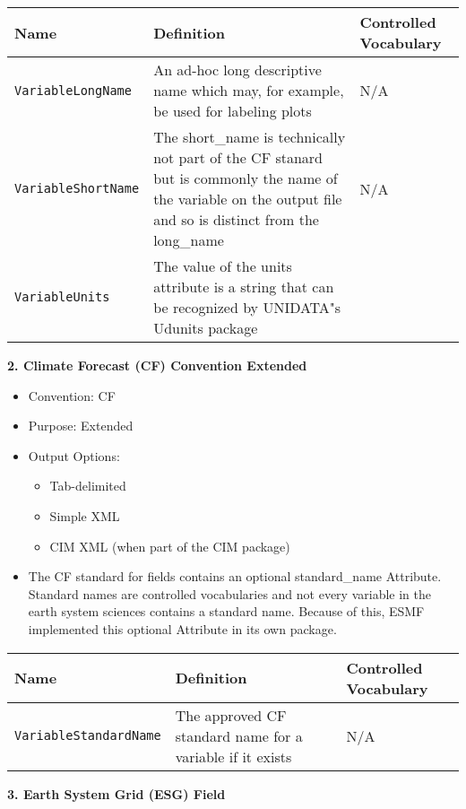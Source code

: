 \begin{tabular}{|p{8cm}|p{20cm}|p{10cm}|}
    {\bf Name } & {\bf Definition} & {\bf Controlled Vocabulary} \\
    \hline\hline
    {\tt VariableLongName} & An ad-hoc long descriptive name which may, for example, be used for labeling plots & N/A\\
    {\tt VariableShortName}  & The short\_name is technically not part of the CF stanard but is commonly the name of the variable on the output file and so is distinct from the long\_name & N/A \\
    {\tt VariableUnits}  & The value of the units attribute is a string that can be recognized by UNIDATA"s Udunits package & \\
\end{tabular}




\vspace{.25in}
{\bf 2. Climate Forecast (CF) Convention Extended}

\begin{itemize}
    \item Convention: CF
    \item Purpose: Extended
    \item Output Options: 
    \begin{itemize}
        \item Tab-delimited
        \item Simple XML
        \item CIM XML (when part of the CIM package)
    \end{itemize} 
    \item The CF standard for fields contains an optional standard\_name Attribute. Standard names are controlled vocabularies and not every variable in the earth system sciences contains a standard name. Because of this, ESMF implemented this optional Attribute in its own package.
\end{itemize}

\begin{tabular}{|p{8cm}|p{20cm}|p{10cm}|}
    {\bf Name } & {\bf Definition} & {\bf Controlled Vocabulary} \\
    \hline\hline
    {\tt VariableStandardName} & The approved CF standard name for a variable if it exists &  N/A\\
\end{tabular}



\vspace{.25in}
{\bf 3. Earth System Grid (ESG) Field}

